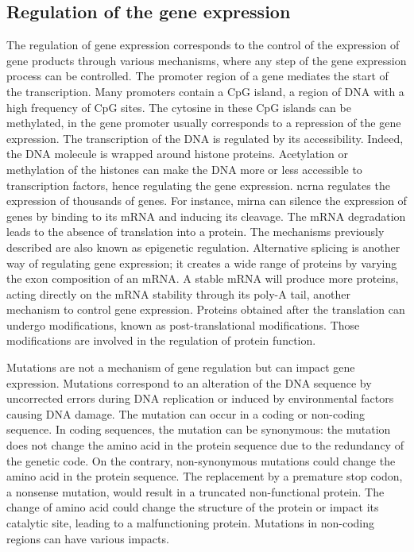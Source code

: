 \documentclass[../main.tex]{subfiles}
\begin{document}
 \subsection{Regulation of the gene expression}
	 The regulation of gene expression corresponds to the control of the expression of gene products through various mechanisms,
	 where any step of the gene expression process can be controlled.
	 The promoter region of a gene mediates the start of the transcription.
	 Many promoters contain a CpG island, a region of DNA with a high frequency of CpG sites.
	 The cytosine in these CpG islands can be methylated,  in the gene promoter usually corresponds to a repression of the gene expression.
	 The transcription of the DNA is regulated by its accessibility.
	 Indeed, the DNA molecule is wrapped around histone proteins.
	 Acetylation or methylation of the histones can make the DNA more or less accessible to transcription factors, hence regulating the gene expression.
	 \Gls{ncrna} regulates the expression of thousands of genes.
	 For instance, \gls{mirna} can silence the expression of genes by binding to its mRNA and inducing its cleavage.
	 The mRNA degradation leads to the absence of translation into a protein.
	 The mechanisms previously described are also known as epigenetic regulation.
	 Alternative splicing is another way of regulating gene expression; it creates a wide range of proteins by varying the exon composition of an mRNA\@.
	 A stable mRNA will produce more proteins, acting directly on the mRNA stability through its poly-A tail, another mechanism to control gene expression.
	 Proteins obtained after the translation can undergo modifications, known as post-translational modifications.
	 Those modifications are involved in the regulation of protein function.

	 Mutations are not a mechanism of gene regulation but can impact gene expression.
	 Mutations correspond to an alteration of the DNA sequence by uncorrected errors during DNA replication or induced by environmental factors causing DNA damage.
	 The mutation can occur in a coding or non-coding sequence.
	 In coding sequences, the mutation can be synonymous: the mutation does not change the amino acid in the protein sequence due to the redundancy of the genetic code.
	 On the contrary, non-synonymous mutations could change the amino acid in the protein sequence.
	 The replacement by a premature stop codon, a nonsense mutation, would result in a truncated non-functional protein.
	 The change of amino acid could change the structure of the protein or impact its catalytic site, leading to a malfunctioning protein.
	 Mutations in non-coding regions can have various impacts.
\end{document}
